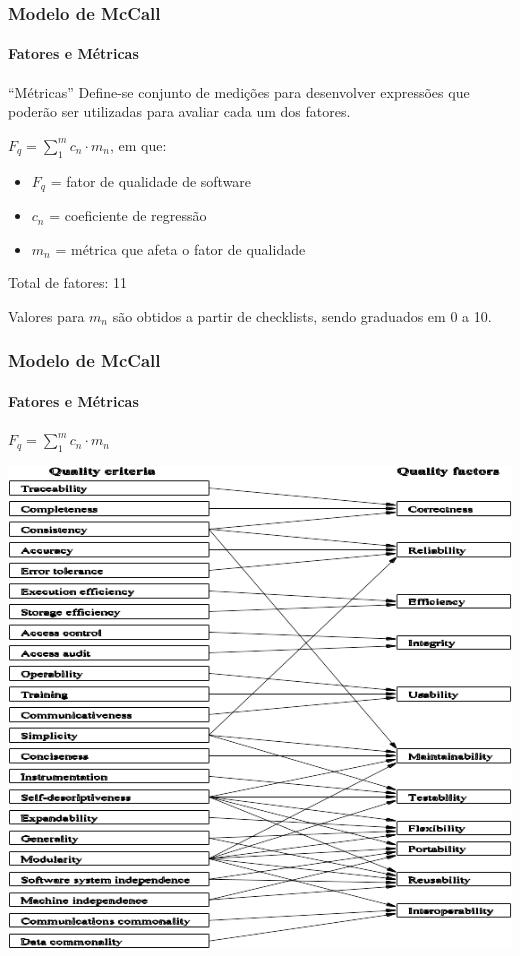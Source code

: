 \begin{frame}
	\frametitle{Modelo de McCall}
	\framesubtitle{Fatores e Métricas}

	\begin{block:fact}{``Métricas''}
		Define-se conjunto de medições para desenvolver expressões que poderão ser
		utilizadas para avaliar cada um dos fatores.
	\end{block:fact}
	
	\begin{block:fact}{}
		$F_q = \sum_{1}^m c_n \cdot m_n$, em que:
		\begin{itemize}
		 \item $F_q$ = fator de qualidade de software
		 \item $c_n$ = coeficiente de regressão
		 \item $m_n$ = métrica que afeta o fator de qualidade
		\end{itemize}
	\end{block:fact}
	
	\begin{block:fact}{}
		Total de fatores: 11
	
		Valores para $m_n$ são obtidos a partir de checklists, sendo graduados em
		0 a 10.
	\end{block:fact}
\end{frame}



\begin{frame}
	\frametitle{Modelo de McCall}
	\framesubtitle{Fatores e Métricas}

	\begin{block:fact}{}
		$F_q = \sum_{1}^m c_n \cdot m_n$
	\end{block:fact}

	\begin{block:fact}{}
		\centering
		\includegraphics[width=.7\textwidth]{software-engineering/project-management/product/mccall/mccall-factor_metrics}
	\end{block:fact}
\end{frame}

